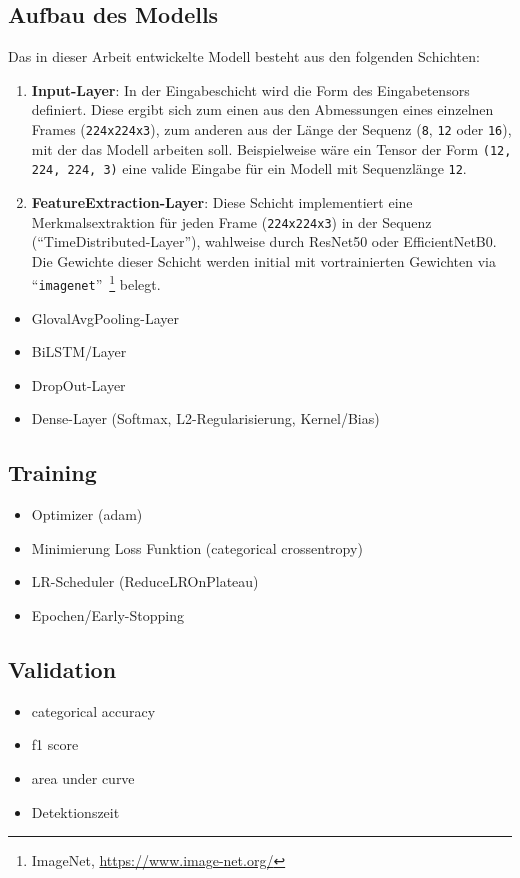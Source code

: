 \documentclass{article}
\begin{document}
    \subsection{Aufbau des Modells}
    Das in dieser Arbeit entwickelte Modell besteht aus den folgenden Schichten:
    \begin{enumerate}
        \item\textbf{Input-Layer}: In der Eingabeschicht wird die Form des Eingabetensors definiert. Diese ergibt sich zum einen aus den Abmessungen eines einzelnen Frames (\texttt{224x224x3}), zum anderen aus der Länge der Sequenz (\texttt{8}, \texttt{12} oder \texttt{16}), mit der das Modell arbeiten soll. Beispielweise wäre ein Tensor der Form \texttt{(12, 224, 224, 3)} eine valide Eingabe für ein Modell mit Sequenzlänge \texttt{12}.
        \item\textbf{FeatureExtraction-Layer}: Diese Schicht implementiert eine Merkmalsextraktion für jeden Frame (\texttt{224x224x3}) in der Sequenz (\enquote{TimeDistributed-Layer}), wahlweise durch ResNet50 oder EfficientNetB0. Die Gewichte dieser Schicht werden initial mit vortrainierten Gewichten via \enquote{\texttt{imagenet}}~\footnote{ImageNet, \url{https://www.image-net.org/}} belegt.
    \end{enumerate}
    \begin{itemize}
        \item GlovalAvgPooling-Layer
        \item BiLSTM/Layer
        \item DropOut-Layer
        \item Dense-Layer (Softmax, L2-Regularisierung, Kernel/Bias)
    \end{itemize}
    \subsection{Training}
    \begin{itemize}
        \item Optimizer (adam)
        \item Minimierung Loss Funktion (categorical crossentropy)
        \item LR-Scheduler (ReduceLROnPlateau)
        \item Epochen/Early-Stopping
    \end{itemize}
    \subsection{Validation}
    \begin{itemize}
        \item categorical accuracy
        \item f1 score
        \item area under curve
        \item Detektionszeit
    \end{itemize}
\end{document}
